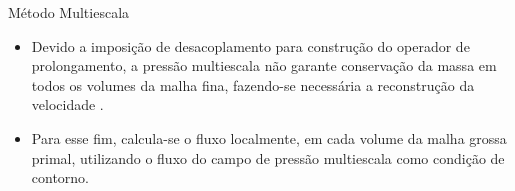 \documentclass[professionalfont]{beamer}
\begin{document}
\begin{frame}{Método Multiescala}
    
    \small
    
    \begin{itemize}
        \item Devido a imposição de desacoplamento para construção do operador de prolongamento, a pressão multiescala não garante conservação da massa em todos os volumes da malha fina, fazendo-se necessária a reconstrução da velocidade \cite{Moyner_2014,Jenny2003}.
        \item Para esse fim, calcula-se o fluxo localmente, em cada volume da malha grossa primal, utilizando o fluxo do campo de pressão multiescala como condição de contorno.
    \end{itemize}
    

    



\end{frame}
\end{document}
